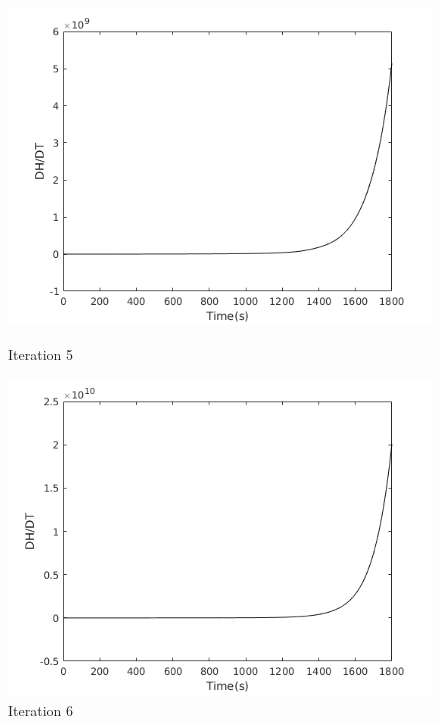 \begin{figure}[h!]
  \centering
  \begin{minipage}[b]{0.4\textwidth}
    \includegraphics[width=\textwidth]{h5.png}
    \caption{Iteration 5}
  \end{minipage}
  \hfill
  \begin{minipage}[b]{0.4\textwidth}
    \includegraphics[width=\textwidth]{h6.png}
    \caption{Iteration 6}
  \end{minipage}
\end{figure}